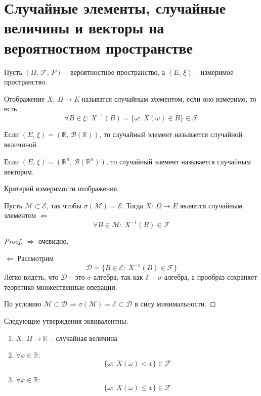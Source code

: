 \section{Случайные элементы, случайные величины и векторы на вероятностном пространстве}
Пусть $(\Omega,\, \mathcal{F},\, P)$ -- вероятностное пространство, а $(E,\, \xi)$ -- измеримое пространство.

\begin{definition}
	Отображение $X:\: \Omega \to E$ называтся случайным элементом, если оно измеримо, то есть
	\[\forall B \in \xi:\: X^{-1}(B) = \{\omega :\: X(\omega) \in B\} \in \mathcal{F}\]
\end{definition}

\begin{definition}
	Если $(E,\, \xi) = (\mathbb{R},\, \mathcal{B}(\mathbb{R}))$, то случайный элемент называется случайной величиной.
\end{definition}

\begin{definition}
	Если $(E,\,\xi) = (\mathbb{R}^n,\, \mathcal{B}(\mathbb{R}^n))$, то случайный элемент называется случайным вектором.
\end{definition}

\begin{lemma}
	Критерий измеримости отображения.

	Пусть $\mathcal{M} \subset \mathcal{E}$, так чтобы $\sigma(\mathcal{M}) = \mathcal{E}$.
	Тогда $X:\: \Omega \to E$ является случайным элементом $\Leftrightarrow$
	\[\forall B \in \mathcal{M}:\: X^{-1}(B) \in \mathcal{F}\]
\end{lemma}

\begin{proof}
	$\Rightarrow$ очевидно.

	$\Leftarrow$ Рассмотрим
	\[\mathcal{D} = \{B \in \mathcal{E}:\: X^{-1}(B) \in \mathcal{F}\}\]
	Легко видеть, что $\mathcal{D}$ -- это $\sigma$-алгебра, так как $\mathcal{E}$ -- $\sigma$-алгебра, а прообраз сохраняет теоретико-множественные операции.

	По условию $\mathcal{M} \subset \mathcal{D} \Rightarrow \sigma(\mathcal{M}) = \mathcal{E} \subset \mathcal{D}$ в силу минимальности.
\end{proof}

\begin{corollary}
	Следующие утверждения эквивалентны:
	\begin{enumerate}
		\item $X:\: \Omega \to \mathbb{R}$ -- случайная величина
		\item $\forall x \in \mathbb{R}$:
		      \[\{\omega:\: X(\omega) < x\} \in \mathcal{F}\]
		\item $\forall x \in \mathbb{R}$:
		      \[\{\omega:\: X(\omega) \leq x\} \in \mathcal{F}\]
	\end{enumerate}
\end{corollary}

